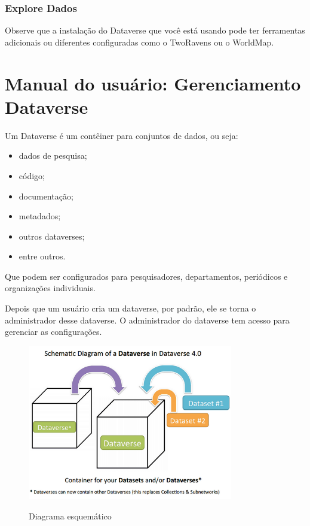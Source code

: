 \documentclass[12pt,hidelinks]{article}
\begin{document}
    	\subsubsection{Explore Dados}
	
\qquad Observe que a instalação do Dataverse que você está usando pode ter ferramentas adicionais ou diferentes configuradas como o TwoRavens ou o WorldMap.
	
\newpage

\section{Manual do usuário: Gerenciamento Dataverse}
\vspace{10.5cm}

\qquad Um Dataverse é um contêiner para conjuntos de dados, ou seja: 

\begin{itemize}
    \item dados de pesquisa;
    \item código;
    \item documentação;
    \item metadados;
    \item outros dataverses;
    \item entre outros.
\end{itemize}

Que podem ser configurados para pesquisadores, departamentos, periódicos e organizações individuais.

Depois que um usuário cria um dataverse, por padrão, ele se torna o administrador desse dataverse. O administrador do dataverse tem acesso para gerenciar as configurações.


\begin{figure}[H]
\caption{Diagrama esquemático}
\centering
    \includegraphics[width=0.8\textwidth]{Dataverse-Diagram.png}
    \label{Diagrama dataverse}
\end{figure}
\end{document}
